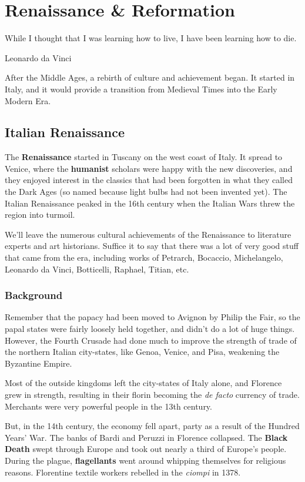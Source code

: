 \chapter{Renaissance \& Reformation}

\epigraph{%
  While I thought that I was learning how to live, I have been learning how to die.
}{Leonardo da Vinci}

After the Middle Ages, a rebirth of culture and achievement began.
It started in Italy, and it would provide a transition from Medieval Times into the Early Modern Era.

\section{Italian Renaissance}

The \textbf{Renaissance} started in Tuscany on the west coast of Italy.
It spread to Venice, where the \textbf{humanist} scholars were happy with the new discoveries,
and they enjoyed interest in the classics that had been forgotten in what they called the Dark Ages
(so named because light bulbs had not been invented yet).
The Italian Renaissance peaked in the 16th century when the Italian Wars threw the region into turmoil.

We'll leave the numerous cultural achievements of the Renaissance to literature experts and art historians.
Suffice it to say that there was a lot of very good stuff that came from the era,
including works of Petrarch, Bocaccio, Michelangelo, Leonardo da Vinci, Botticelli, Raphael, Titian, etc.

\subsection*{Background}

Remember that the papacy had been moved to Avignon by Philip the Fair,
so the papal states were fairly loosely held together, and didn't do a lot of huge things.
However, the Fourth Crusade had done much to improve the strength of trade of the northern Italian city-states,
like Genoa, Venice, and Pisa, weakening the Byzantine Empire.

Most of the outside kingdoms left the city-states of Italy alone,
and Florence grew in strength, resulting in their florin becoming the \textit{de facto} currency of trade.
Merchants were very powerful people in the 13th century.

But, in the 14th century, the economy fell apart, party as a result of the Hundred Years' War.
The banks of Bardi and Peruzzi in Florence collapsed.
The \textbf{Black Death} swept through Europe and took out nearly a third of Europe's people.
During the plague, \textbf{flagellants} went around whipping themselves for religious reasons.
Florentine textile workers rebelled in the \textit{ciompi} in 1378.

